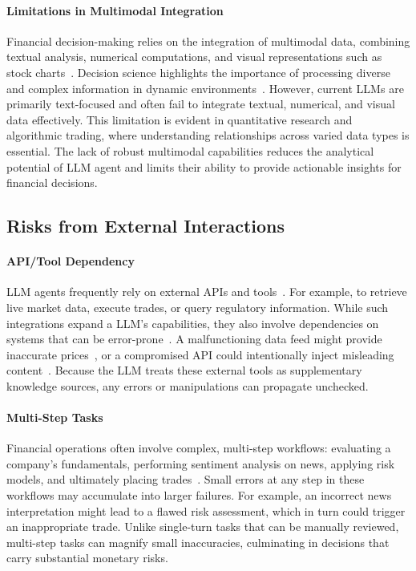 \paragraph{Limitations in Multimodal Integration}

Financial decision-making relies on the integration of multimodal data, combining textual analysis, numerical computations, and visual representations such as stock charts~\citep{zhang2024finagent}. Decision science highlights the importance of processing diverse and complex information in dynamic environments~\citep{ijcai2024p875}. However, current LLMs are primarily text-focused and often fail to integrate textual, numerical, and visual data effectively.
This limitation is evident in quantitative research and algorithmic trading, where understanding relationships across varied data types is essential. The lack of robust multimodal capabilities reduces the analytical potential of LLM agent and limits their ability to provide actionable insights for financial decisions.




\subsection{Risks from External Interactions}\label{sec:external_risks}
\paragraph{API/Tool Dependency}
LLM agents frequently rely on external APIs and tools~\citep{Shen2025shortcutsbench}. For example, to retrieve live market data, execute trades, or query regulatory information. While such integrations expand a LLM's capabilities, they also involve dependencies on systems that can be error-prone~\citep{zhao2024attacks}. A malfunctioning data feed might provide inaccurate prices~\citep{tivnan2018price}, or a compromised API could intentionally inject misleading content~\citep{zhao2024attacks}. Because the LLM treats these external tools as supplementary knowledge sources, any errors or manipulations can propagate unchecked.


\paragraph{Multi-Step Tasks}
Financial operations often involve complex, multi-step workflows: evaluating a company's fundamentals, performing sentiment analysis on news, applying risk models, and ultimately placing trades~\citep{nie2024survey}. Small errors at any step in these workflows may accumulate into larger failures. For example, an incorrect news interpretation might lead to a flawed risk assessment, which in turn could trigger an inappropriate trade.
Unlike single-turn tasks that can be manually reviewed, multi-step tasks can magnify small inaccuracies, culminating in decisions that carry substantial monetary risks.

